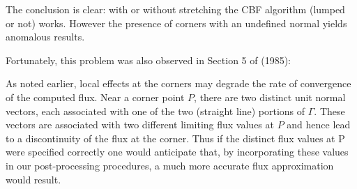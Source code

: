 The conclusion is clear: with or without stretching the CBF algorithm (lumped or not) works. 
However the presence of corners with an undefined normal yields anomalous results. 

Fortunately, this problem was also observed in Section 5 of \textcite{cacs85} (1985):
\begin{displayquote}
As noted earlier, local effects at the corners may degrade the rate of convergence of the
computed flux. Near a corner point $P$, there are two distinct unit normal vectors, each
associated with one of the two (straight line) portions of $\Gamma$. These vectors are associated with
two different limiting flux values at $P$ and hence lead to a discontinuity of the flux at the
corner. Thus if the distinct flux values at P were specified correctly one would anticipate that,
by incorporating these values in our post-processing procedures, a much more accurate flux
approximation would result.
\end{displayquote}





